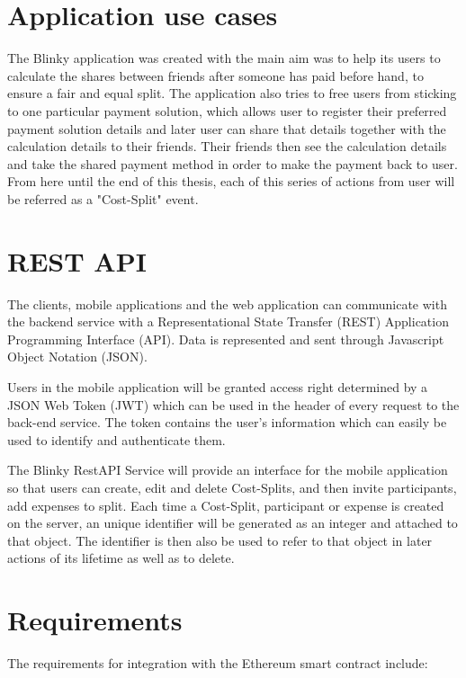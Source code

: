 \documentclass[twoside,draftfooter]{tutthesis} %
\begin{document}
\section{Application use cases}

The Blinky application was created with the main aim was to help its users to calculate the shares between friends after someone has paid before hand, to ensure a fair and equal split. The application also tries to free users from sticking to one particular payment solution, which allows user to register their preferred payment solution details and later user can share that details together with the calculation details to their friends. Their friends then see the calculation details and take the shared payment method in order to make the payment back to user. From here until the end of this thesis, each of this series of actions from user will be referred as a "Cost-Split" event.

\section{REST API}

The clients, mobile applications and the web application  can communicate with the backend service with a Representational State Transfer (REST)  \citep{REST} Application Programming Interface (API). Data is represented and sent through Javascript Object Notation (JSON).

Users in the mobile application will be granted access right determined by a JSON Web Token (JWT) which can be used in the header of every request to the back-end service. The token contains the user's information which  can easily be used to identify and authenticate them.

The Blinky RestAPI Service will provide an interface for the mobile application so that users can create, edit and delete Cost-Splits, and then invite participants, add expenses to split. Each time a Cost-Split, participant or expense is created on the server, an unique identifier will be generated as an integer and attached to that object. The identifier is then also be used to refer to that object in later actions of its lifetime as well as to delete.
\label{blinkyAPI}

\section{Requirements}
\label{section:requirements}

The requirements for integration with the Ethereum smart contract include:
\end{document}
